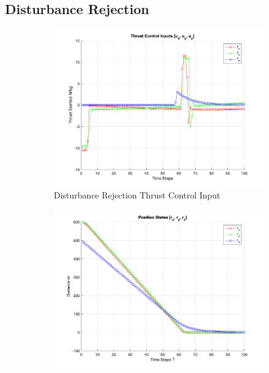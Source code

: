 \documentclass[conference, tikz]{IEEEtran}
\begin{document}
\subsection{Disturbance Rejection}
\begin{figure}[H]
    \centering
    \begin{subfigure}{\columnwidth}
        \centering
        \includegraphics[width=\columnwidth]{new_final_figs/DR_Constrained_input_plot.png}
        \caption{Disturbance Rejection Thrust Control Input}
        \label{DR:control_in}
    \end{subfigure}
    \begin{subfigure}{\columnwidth}
        \centering
        \includegraphics[width=\columnwidth]{new_final_figs/DR_Constrained_position_state_plot.png}

\end{subfigure}
\end{figure}
\end{document}

